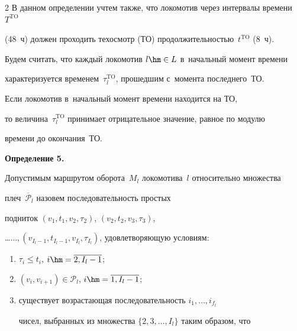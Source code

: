 \begin{multicols}{2}
В данном определении учтем также, что локомотив через интервалы времени~$T^{\mathrm{TO}}$ 


(48~ч) должен проходить техосмотр (ТО) продолжительностью~$t^{\mathrm{TO}}$ (8~ч). 


Будем считать, что каждый локомотив $l\hm\in L$ в~начальный момент времени 


характеризуется временем~$\tau_l^{\mathrm{TO}}$, прошедшим с~момента последнего~ТО.


Если локомотив в~начальный момент времени находится на ТО, 


то величина~$\tau_l^{\mathrm{TO}}$ принимает отрицательное значение, равное по модулю 


времени до окончания~ТО.





\smallskip





\noindent


\textbf{Определение 5.}\ %


    Допустимым маршрутом оборота~$M_l$  локомотива~$l$ относительно множества 


    плеч~$\overline {\mathcal P}_l$ назовем последовательность прос\-тых 


    подниток $(v_1, t_1, v_2, \tau_2)$,  $(v_2, t_2, v_3, \tau_3)$, 


    \ldots\linebreak $\ldots , (v_{I_l-1}, t_{I_l-1}, v_{I_l}, \tau_{I_l})$, удовлетворяющую условиям:


\begin{enumerate}[(1)]


\item $\tau_{i} \leqslant t_{i}$, $i \hm= \overline{2,I_l -1}$;





\item $(v_i,v_{i+1}) \in\mathcal {P}_l $,  $i \hm= \overline{1,I_l -1}$;





\item существует возрастающая последовательность $i_1, \ldots, i_{f_l}$ 


чисел, выбранных из множества $\{2,3,\ldots,I_l\}$ таким образом, что


\begin{enumerate}[({3}.1)]



\end{enumerate}
\end{enumerate}
\end{multicols}
